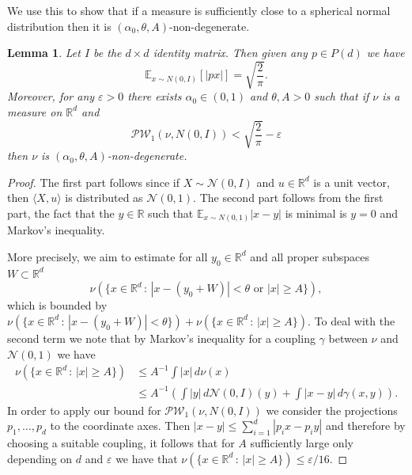 \documentclass[10pt, english,oneside,reqno]{amsart}
\theoremstyle{plain}
\newtheorem{lemma}[theorem]{Lemma}
\theoremstyle{remark}
\numberwithin{equation}{section}
\numberwithin{figure}{section}
\newcommand{\eps}{\varepsilon}
\newcommand{\R}{\mathbb{R}}
\begin{document}
We use this to show that if a measure is sufficiently close to a spherical normal distribution then it is $(\alpha_0, \theta, A)$-non-degenerate.

\begin{lemma} \label{CloseToNormalNonDegen}
    Let $I$ be the $d\times d$ identity matrix. Then given any $p \in P(d)$ we have $$\mathbb{E}_{x \sim N(0,I)}[|p x|] = \sqrt{\frac{2}{\pi}}.$$ Moreover, for any $\varepsilon > 0$ there exists $\alpha_0 \in (0, 1)$ and $\theta, A > 0$ such that if $\nu$ is a measure on $\R^d$ and $$\mathcal{PW}_1(\nu, N(0, I)) < \sqrt{\frac{2}{\pi}} - \varepsilon$$ then $\nu$ is $(\alpha_0, \theta, A)$-non-degenerate.
\end{lemma}

\begin{proof}
    The first part follows since if $X \sim \mathcal{N}(0,I)$ and $u \in \R^d$ is a unit vector, then $\langle X,u \rangle$ is distributed as $\mathcal{N}(0,1)$. The second part follows from the first part, the fact that the $y \in \R$ such that $\mathbb{E}_{x \sim N(0,1)} |x-y|$ is minimal is $y=0$ and Markov's inequality.
    
    More precisely, we aim to estimate for all $y_0 \in \R^d$ and all proper subspaces $W \subset \R^d$ $$\nu(\{ x \in \R^d \,:\, |x-(y_0 + W)| < \theta \text{ or } |x| \geq A  \}),$$ which is bounded by $\nu(\{ x \in \R^d \,:\, |x-(y_0 + W)| < \theta  \}) + \nu(\{ x \in \R^d \,:\, |x| \geq A  \})$. To deal with the second term we note that by Markov's inequality for a coupling $\gamma$ between $\nu$ and $\mathcal{N}(0,1)$ we have 
    \begin{align*}
        \nu(\{ x \in \R^d \,:\, |x| \geq A  \}) &\leq A^{-1} \int |x| \, d\nu(x) \\
        &\leq A^{-1}\left( \int |y| \, d\mathcal{N}(0,I)(y) + \int |x-y| \, d\gamma(x,y) \right).
    \end{align*} In order to apply our bound for $\mathcal{PW}_1(\nu, N(0, I))$ we consider the projections $p_1, \ldots , p_d$ to the coordinate axes. Then $|x-y| \leq \sum_{i = 1}^d |p_ix - p_iy|$ and therefore by choosing a suitable coupling, it follows that for $A$ sufficiently large only depending on $d$ and $\eps$ we have that $\nu(\{ x \in \R^d \,:\, |x| \geq A  \}) \leq \eps/16$.
    

\end{proof}
\end{document}
